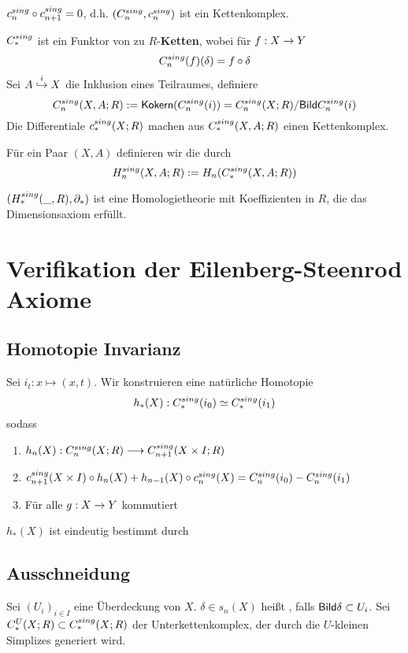 \Lem{}
$c^{sing}_{n} \circ c^{sing}_{n+1} = 0$, d.h. $(C^{sing}_{n}, c^{sing}_{n})$ ist ein Kettenkomplex.

\Bem{}
$C^{sing}_{*}$ ist ein Funktor von \Top zu $R$-\textbf{Ketten}, wobei für $f : X\overset{}{\rightarrow} Y$
\[ C^{sing}_{n}(f)(\delta) = f \circ \delta \]
Sei $A \overset{i}{\hookrightarrow} X$ die Inklusion eines Teilraumes, definiere
\[ C^{sing}_{n}(X, A; R) := \textsf{Kokern} (C^{sing}_{n}(i))  = C^{sing}_{n}(X;R) /\textsf{Bild} C^{sing}_{n}(i) \]
Die Differentiale $c^{sing}_{*}(X;R)$ machen aus $C^{sing}_{*}(X,A;R)$ einen Kettenkomplex.

\Def{}
Für ein Paar $(X,A)$ definieren wir die  durch
\[H^{sing}_{n}(X,A;R) := H_n(C^{sing}_{*}(X,A;R)) \]

\Satz{}
$(H^{sing}_{*}(\_,R), \partial_*)$ ist eine Homologietheorie mit Koeffizienten in $R$, die das Dimensionsaxiom erfüllt.

\section{Verifikation der Eilenberg-Steenrod Axiome}

\subsection{Homotopie Invarianz}
Sei $i_t : x \mapsto (x,t)$. Wir konstruieren eine natürliche Homotopie
\[ h_*(X) : C^{sing}_{*}(i_0) \simeq C^{sing}_{*}(i_1) \]
sodass
\begin{enumerate}
\item $h_n(X) : C^{sing}_{n}(X; R) \longrightarrow C^{sing}_{n+1}(X\times I; R) $
\item $c^{sing}_{n+1}(X\times I) \circ h_n(X) + h_{n-1}(X) \circ c^{sing}_{n}(X) = C^{sing}_{n}(i_0) - C^{sing}_{n}(i_1) $
\item Für alle $g : X \overset{}{\rightarrow} Y$ kommutiert
\begin{center}
\end{center}
\end{enumerate}

$h_*(X)$ ist eindeutig bestimmt durch
\begin{center}
\end{center}

\subsection{Ausschneidung}
\Def{}
Sei $(U_i)_{i\in I}$ eine Überdeckung von $X$. $\delta \in s_n(X)$ heißt , falls $\textsf{Bild} \delta \subset U_i$.
Sei $C^U_*(X; R) \subset C^{sing}_{*}(X;R)$ der Unterkettenkomplex, der durch die $U$-kleinen Simplizes generiert wird.

